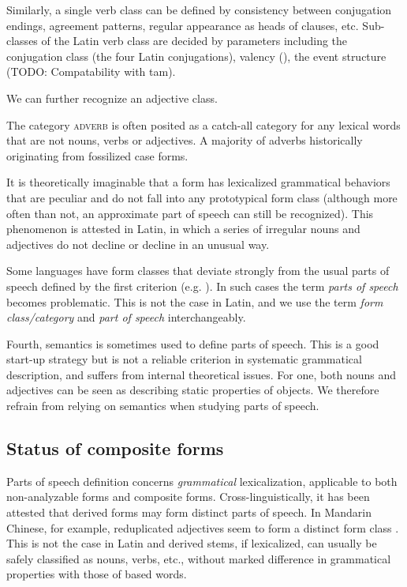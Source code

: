 \documentclass[a4paper, oneside, 12pt]{report}
\newcommand*{\citesec}[1]{\S~{#1}}
\newcommand*{\citepage}[1]{p.~{#1}}
\newcommand*{\term}[1]{\emph{#1}}
\newcommand*{\category}[1]{\textsc{#1}}
\begin{document}
Similarly, a single verb class can be defined by consistency between conjugation endings, agreement patterns, regular appearance as heads of clauses, etc.
Sub-classes of the Latin verb class are decided by parameters including
the conjugation class (the four Latin conjugations),
valency (), 
the event structure (TODO: Compatability with \acs{tam}).

We can further recognize an adjective class.

The category \category{adverb} is often posited as a catch-all category
for any lexical words that are not nouns, verbs or adjectives.
A majority of adverbs historically originating from fossilized case forms.


It is theoretically imaginable that a form has lexicalized grammatical behaviors that are peculiar and do not fall into any prototypical form class (although more often than not, an approximate part of speech can still be recognized).
This phenomenon is attested in Latin, in which a series of irregular nouns and adjectives do not decline or decline in an unusual way.

Some languages have form classes that deviate strongly from the usual parts of speech defined by the first criterion (e.g. \citealt[\citepage{372}]{siddiqi2020routledge}).
In such cases the term \term{parts of speech} becomes problematic.
This is not the case in Latin,
and we use the term \term{form class/category} and \term{part of speech} interchangeably.

Fourth, semantics is sometimes used to define parts of speech.
This is a good start-up strategy but is not a reliable criterion in systematic grammatical description, and suffers from internal theoretical issues.
For one, both nouns and adjectives can be seen as describing static properties of objects.
We therefore refrain from relying on semantics when studying parts of speech.

\subsection{Status of composite forms}

Parts of speech definition concerns \emph{grammatical} lexicalization,
applicable to both non-analyzable forms and composite forms. 
Cross-linguistically, it has been attested that derived forms may form distinct parts of speech.
In Mandarin Chinese, for example, reduplicated adjectives seem to form a distinct form class
\citep[\citesec{5.3}]{paul2014new}.
This is not the case in Latin and derived stems, if lexicalized, can usually be safely classified as nouns, verbs, etc., without marked difference in grammatical properties with those of based words.
\end{document}
